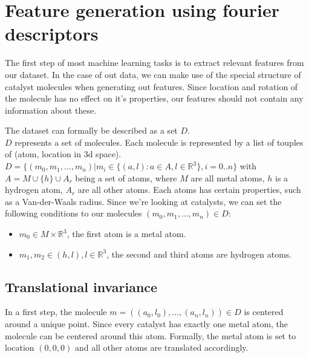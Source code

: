 
\chapter{Feature generation using fourier descriptors}
\label{ch:Content1}

The first step of most machine learning tasks is to extract relevant features from our dataset.
In the case of out data, we can make use of the special structure of catalyst molecules when generating out features.
Since location and rotation of the molecule has no effect on it's properties, our features should not contain any information about these.

The dataset can formally be described as a set $D$. \\
$D$ represents a set of molecules. Each molecule is represented by a list of touples of (atom, location in 3d space). \\
$D = \{(m_0, m_1, \dots, m_n)| m_i \in \{ (a, l): a \in A, l \in \mathbb{R}^3\}, i = 0..n\}$ with $A = M \cup \{h\} \cup A_r$ being a set of atoms, where $M$ are all metal atoms, $h$ is a hydrogen atom, $A_r$ are all other atoms. 
Each atoms has certain properties, such as a Van-der-Waals radius. 
Since we're looking at catalysts, we can set the following conditions to our molecules $(m_0, m_1, \dots, m_n) \in D$:
\begin{itemize}
  \item $m_0 \in M \times \mathbb{R}^3$, the first atom is a metal atom.
  \item $m_1, m_2 \in (h, l), l \in \mathbb{R}^3$, the second and third atoms are hydrogen atoms.
\end{itemize}

\section{Translational invariance}


In a first step, the molecule $m=((a_0, l_0),\dots,(a_n, l_n)) \in D$ is centered around a unique point.
Since every catalyst has exactly one metal atom, the molecule can be centered around this atom.
Formally, the metal atom is set to location $(0,0,0)$ and all other atoms are translated accordingly.

